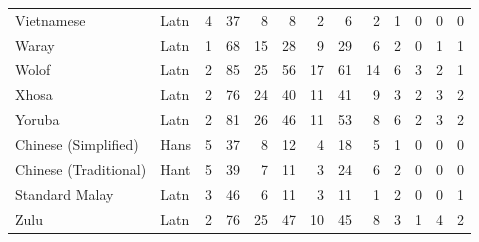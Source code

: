 \begin{small}
\begin{longtable}{llrrrrrrrrrrr}
Vietnamese & Latn & 4 & 37 & 8 & 8 & 2 & 6 & 2 & 1 & 0 & 0 & 0 \\
Waray & Latn & 1 & 68 & 15 & 28 & 9 & 29 & 6 & 2 & 0 & 1 & 1 \\
Wolof & Latn & 2 & 85 & 25 & 56 & 17 & 61 & 14 & 6 & 3 & 2 & 1 \\
Xhosa & Latn & 2 & 76 & 24 & 40 & 11 & 41 & 9 & 3 & 2 & 3 & 2 \\
Yoruba & Latn & 2 & 81 & 26 & 46 & 11 & 53 & 8 & 6 & 2 & 3 & 2 \\
Chinese (Simplified) & Hans & 5 & 37 & 8 & 12 & 4 & 18 & 5 & 1 & 0 & 0 & 0 \\
Chinese (Traditional) & Hant & 5 & 39 & 7 & 11 & 3 & 24 & 6 & 2 & 0 & 0 & 0 \\
Standard Malay & Latn & 3 & 46 & 6 & 11 & 3 & 11 & 1 & 2 & 0 & 0 & 1 \\
Zulu & Latn & 2 & 76 & 25 & 47 & 10 & 45 & 8 & 3 & 1 & 4 & 2 \\
\end{longtable}
\end{small}